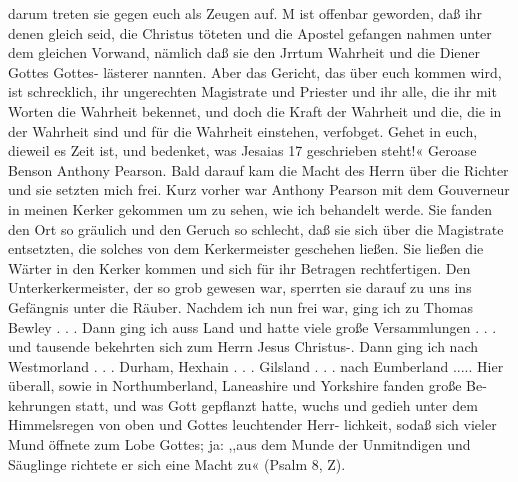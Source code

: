 darum treten sie gegen euch als Zeugen auf. M ist offenbar
geworden, daß ihr denen gleich seid, die Christus töteten und die
Apostel gefangen nahmen unter dem gleichen Vorwand, nämlich
daß sie den Jrrtum Wahrheit und die Diener Gottes Gottes-
lästerer nannten. Aber das Gericht, das über euch kommen wird,
ist schrecklich, ihr ungerechten Magistrate und Priester und ihr
alle, die ihr mit Worten die Wahrheit bekennet, und doch die
Kraft der Wahrheit und die, die in der Wahrheit sind und für die
Wahrheit einstehen, verfobget. Gehet in euch, dieweil es Zeit
ist, und bedenket, was Jesaias 17 geschrieben steht!«
Geroase Benson
Anthony Pearson.
Bald darauf kam die Macht des Herrn über die Richter
und sie setzten mich frei. Kurz vorher war Anthony Pearson
mit dem Gouverneur in meinen Kerker gekommen um zu sehen,
wie ich behandelt werde. Sie fanden den Ort so gräulich und
den Geruch so schlecht, daß sie sich über die Magistrate entsetzten,
die solches von dem Kerkermeister geschehen ließen. Sie ließen
die Wärter in den Kerker kommen und sich für ihr Betragen
rechtfertigen. Den Unterkerkermeister, der so grob gewesen war,
sperrten sie darauf zu uns ins Gefängnis unter die Räuber.
Nachdem ich nun frei war, ging ich zu Thomas Bewley . . .
Dann ging ich auss Land und hatte viele große Versammlungen . . .
und tausende bekehrten sich zum Herrn Jesus Christus-.
Dann ging ich nach Westmorland . . . Durham, Hexhain . . .
Gilsland . . . nach Eumberland ..... Hier überall, sowie in
Northumberland, Laneashire und Yorkshire fanden große Be-
kehrungen statt, und was Gott gepflanzt hatte, wuchs und gedieh
unter dem Himmelsregen von oben und Gottes leuchtender Herr-
lichkeit, sodaß sich vieler Mund öffnete zum Lobe Gottes; ja: ,,aus
dem Munde der Unmitndigen und Säuglinge richtete er sich eine
Macht zu« (Psalm 8, Z).


